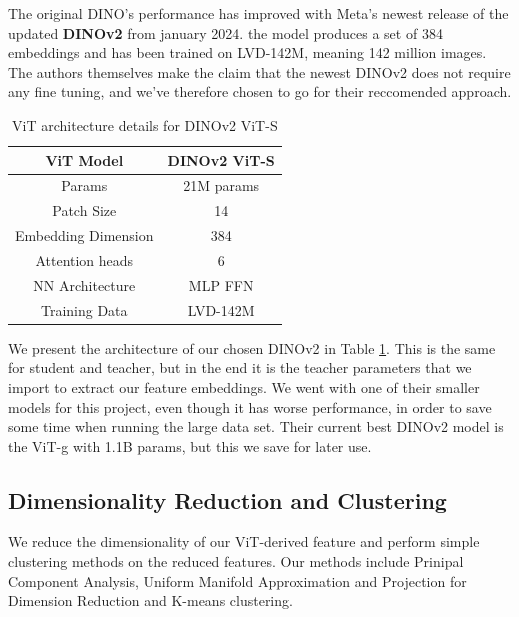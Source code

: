 The original DINO's performance has improved with Meta's newest release of the updated \textbf{DINOv2} \cite{dino2} from january 2024. the model produces a set of 384 embeddings and has been trained on LVD-142M, meaning 142 million images. The authors themselves make the claim that the newest DINOv2 does not require any fine tuning, and we've therefore chosen to go for their reccomended approach. 

\begin{table}[H]
\centering
\caption{ViT architecture details for DINOv2 ViT-S}
\begin{tabular}{c|c}
\textbf{ViT Model} & DINOv2 ViT-S \\ \hline
Params & 21M params \\ 
Patch Size & 14 \\ 
Embedding Dimension & 384 \\
Attention heads & 6 \\ 
NN Architecture & MLP FFN \\
Training Data & LVD-142M \\ 
\end{tabular} \label{tab:vit-params}
\end{table}

We present the architecture of our chosen DINOv2 in Table \ref{tab:vit-params}. This is the same for student and teacher, but in the end it is the teacher parameters that we import to extract our feature embeddings. We went with one of their smaller models for this project, even though it has worse performance, in order to save some time when running the large data set. Their current best DINOv2 model is the ViT-g with 1.1B params, but this we save for later use.



\subsection{Dimensionality Reduction and Clustering}
We reduce the dimensionality of our ViT-derived feature and perform simple clustering methods on the reduced features. Our methods include Prinipal Component Analysis, Uniform Manifold Approximation and Projection for
Dimension Reduction and K-means clustering. 

